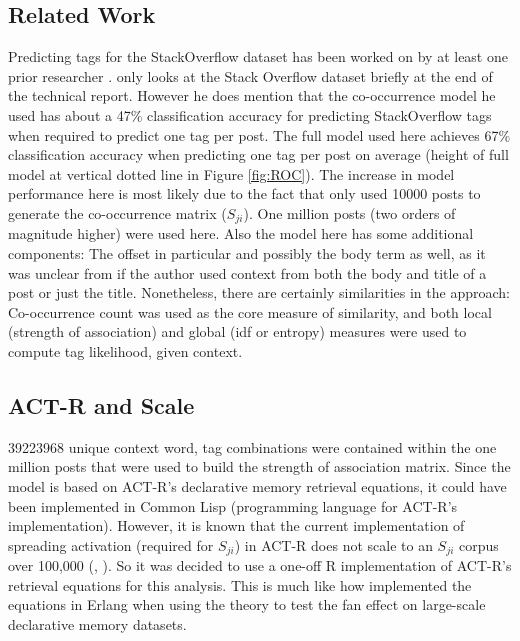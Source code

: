 \documentclass[10pt,letterpaper]{article}
\begin{document}
\subsection{Related Work}
Predicting tags for the StackOverflow dataset has been worked on by at least one prior researcher \cite{Kuo2011}.
 only looks at the Stack Overflow dataset briefly at the end of the technical report.
However he does mention that the co-occurrence model he used has about a 47\% classification accuracy for predicting StackOverflow tags when required to predict one tag per post.
The full model used here achieves 67\% classification accuracy when predicting one tag per post on average
(height of full model at vertical dotted line in Figure \ref{fig:ROC}).
The increase in model performance here is most likely due to the fact that  only used \num{10000} posts to generate the co-occurrence matrix ($S_{ji}$).
One million posts (two orders of magnitude higher) were used here.
Also the model here has some additional components: The offset in particular and possibly the body term as well,
as it was unclear from  if the author used context from both the body and title of a post or just the title. 
Nonetheless, there are certainly similarities in the approach:
Co-occurrence count was used as the core measure of similarity, and both local (strength of association) and global (idf or entropy) measures were used to compute tag likelihood, given context.

\subsection{ACT-R and Scale}
\num{39223968} unique context word, tag combinations were contained within the one million posts that were used to build the strength of association matrix.
Since the model is based on ACT-R's declarative memory retrieval equations, it could have been implemented in Common Lisp (programming language for ACT-R's implementation).
However, it is known that the current implementation of spreading activation (required for $S_{ji}$) in ACT-R does not scale to an $S_{ji}$ corpus over 100,000 (, ).
So it was decided to use a one-off R implementation of ACT-R's retrieval equations for this analysis.
This is much like how  implemented the equations in Erlang when using the theory to test the fan effect on large-scale declarative memory datasets.
\end{document}
